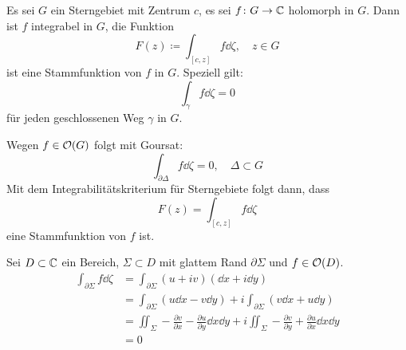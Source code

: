 \begin{satz}
Es sei $ G $ ein Sterngebiet mit Zentrum $ c $, es sei $ f\colon G\rightarrow\mathbb{C} $ holomorph in $ G $. Dann ist $ f $ integrabel in $ G $, die Funktion
\[ F(z)\coloneqq\int_{[c,z]}^{} f\dd\zeta,\quad z\in G \]
ist eine Stammfunktion von $ f $ in $ G $. Speziell gilt:
\[ \int_{\gamma}^{} f\dd\zeta=0 \]
f\"ur jeden geschlossenen Weg $ \gamma $ in $ G $.
\end{satz}
\begin{beweis}
Wegen $ f\in\mathcal O(G) $ folgt mit Goursat:
\[ \int_{\partial\Delta}^{} f\dd\zeta=0,\quad\Delta\subset G \]
Mit dem Integrabilit\"atskriterium f\"ur Sterngebiete folgt dann, dass
\[ F(z)=\int_{[c,z]}^{} f\dd\zeta \] eine Stammfunktion von $ f $ ist.
\end{beweis}
\begin{beweis}
Sei $ D\subset\mathbb{C} $ ein Bereich, $ \Sigma\subset D $ mit glattem Rand $ \partial\Sigma $ und $ f\in\mathcal O(D) $.
\begin{align*} \int_{\partial\Sigma} f\dd\zeta&=\int_{\partial\Sigma}^{} (u+iv)(\dd x+i\dd y)\\&=\int_{\partial\Sigma}(u\dd x-v\dd y)+i\int_{\partial\Sigma}^{} (v\dd x+u\dd y)\\&=\iint_\Sigma -\frac{\partial v}{\partial x}-\frac{\partial u}{\partial y}\dd x\dd y+i\iint_\Sigma-\frac{\partial v}{\partial y}+\frac{\partial u}{\partial x}\dd x\dd y\\&=0 \end{align*}
\end{beweis}
\newpage
